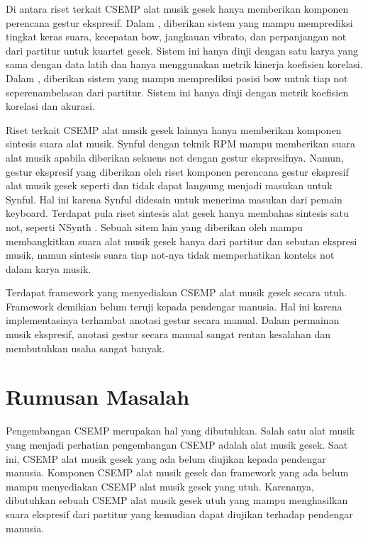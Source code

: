 Di antara riset terkait CSEMP alat musik gesek hanya memberikan komponen perencana gestur ekspresif. Dalam \parencite{marchini2014quartet}, diberikan sistem yang mampu memprediksi tingkat keras suara, kecepatan bow, jangkauan vibrato, dan perpanjangan not dari partitur untuk kuartet gesek. Sistem ini hanya diuji dengan satu karya yang sama dengan data latih dan hanya menggunakan metrik kinerja koefisien korelasi. Dalam \parencite{yu2017bowing}, diberikan sistem yang mampu memprediksi posisi bow untuk tiap not seperenambelasan dari partitur. Sistem ini hanya diuji dengan metrik koefisien korelasi dan akurasi.

Riset terkait CSEMP alat musik gesek lainnya hanya memberikan komponen sintesis suara alat musik. Synful dengan teknik RPM \parencite{lindemann2007rpm} mampu memberikan suara alat musik apabila diberikan sekuens not dengan gestur ekspresifnya. Namun, gestur ekspresif yang diberikan oleh riset komponen perencana gestur ekspresif alat musik gesek seperti \parencite{marchini2014quartet} dan \parencite{yu2017bowing} tidak dapat langsung menjadi masukan untuk Synful. Hal ini karena Synful didesain untuk menerima masukan dari pemain keyboard. Terdapat pula riset sintesis alat gesek hanya membahas sintesis satu not, seperti NSynth \parencite{nsynth2017}. Sebuah sitem lain yang diberikan oleh \parencite{yang2016synthesis} mampu membangkitkan suara alat musik gesek hanya dari partitur dan sebutan ekspresi musik, namun sintesis suara tiap not-nya tidak memperhatikan konteks not dalam karya musik.

Terdapat framework yang menyediakan CSEMP alat musik gesek secara utuh. \parencite{perez2015} Framework demikian belum teruji kepada pendengar manusia. Hal ini karena implementasinya terhambat anotasi gestur secara manual. Dalam permainan musik ekspresif, anotasi gestur secara manual sangat rentan kesalahan dan membutuhkan usaha sangat banyak.


\section{Rumusan Masalah}

Pengembangan CSEMP merupakan hal yang dibutuhkan. Salah satu alat musik yang menjadi perhatian pengembangan CSEMP adalah alat musik gesek. Saat ini, CSEMP alat musik gesek yang ada belum diujikan kepada pendengar manusia. Komponen CSEMP alat musik gesek dan framework yang ada belum mampu menyediakan CSEMP alat musik gesek yang utuh. Karenanya, dibutuhkan sebuah CSEMP alat musik gesek utuh yang mampu menghasilkan suara ekspresif dari partitur yang kemudian dapat diujikan terhadap pendengar manusia.

